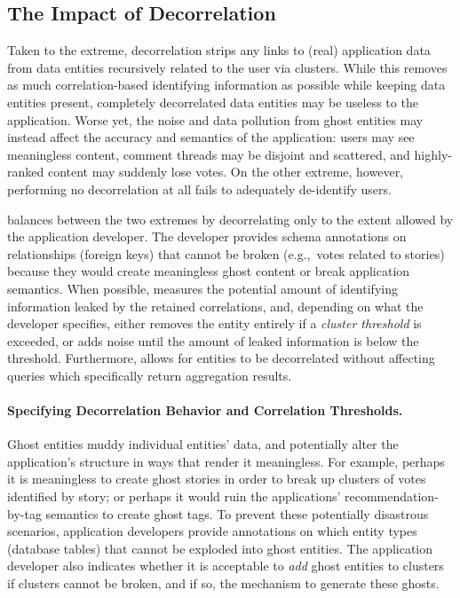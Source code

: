 \subsection{The Impact of Decorrelation}
Taken to the extreme, decorrelation strips any links to (real) application data from data entities
recursively related to the user via clusters. While this removes as much correlation-based
identifying information as possible while keeping data entities present, completely decorrelated
data entities may be useless to the application. Worse yet, the noise and data pollution from ghost
entities may instead affect the accuracy and semantics of the application: users may see meaningless
content, comment threads may be disjoint and scattered, and highly-ranked content may suddenly lose
votes. On the other extreme, however, performing no decorrelation at all fails to adequately de-identify
users. 

\sys{} balances between the two extremes by decorrelating only to the extent allowed by the
application developer. The developer provides schema annotations on relationships (foreign keys)
that cannot be broken (e.g.,\ votes related to stories) because they would create meaningless ghost
content or break application semantics. When possible, \sys{} measures the potential amount of identifying
information leaked by the retained correlations, and, depending on what the developer specifies,
either removes the entity entirely if a \emph{cluster threshold} is exceeded, or adds noise
until the amount of leaked information is below the threshold.  Furthermore, \sys{} allows for
entities to be decorrelated without affecting queries which specifically return aggregation results.

\paragraph{Specifying Decorrelation Behavior and Correlation Thresholds.}
Ghost entities muddy individual entities' data, and potentially alter the application's structure in
ways that render it meaningless. 
For example, perhaps it is meaningless to create ghost stories in order to break up clusters of
votes identified by story; or perhaps it would ruin the applications' recommendation-by-tag
semantics to create ghost tags.   To prevent these potentially disastrous scenarios, application developers
provide annotations on which entity types (database tables) that cannot be exploded into ghost
entities.  The application developer also indicates whether it is acceptable
to \emph{add} ghost entities to clusters if clusters cannot be broken, and if so, the mechanism to
generate these ghosts. 

